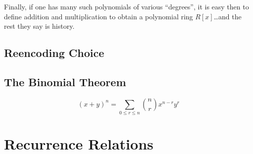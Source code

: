 \documentclass[twoside]{book}
\begin{document}
Finally, if one has many such polynomials of various ``degrees'', it is easy then to define addition
and multiplication to obtain a polynomial ring $ R[x] $\ldots and the rest they say is history.

\section{Reencoding Choice}

\section{The Binomial Theorem}

$$ (x+y)^n=\sum_{0\le r\le n}{n \choose r}x^{n-r}y^r $$

\chapter{Recurrence Relations}
\end{document}
